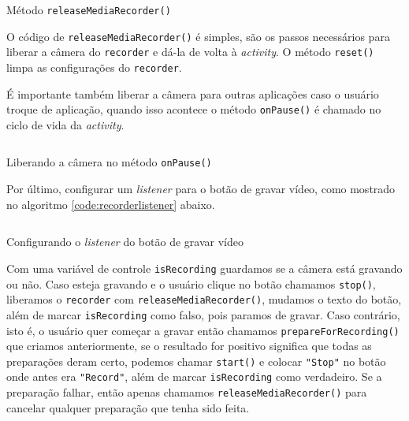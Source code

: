\documentclass[a4paper,12pt,brazil]{book}
\begin{document}
\begin{singlespace}
		\begin{listing}[H]
		\inputminted[linenos=true,fontsize=\small,frame=lines, framesep=2mm, tabsize=2,numbersep=5pt]{java}{src/api/camera/releaseRecorder.java}
		\caption{Método \texttt{releaseMediaRecorder()}}
		\label{code:releaserecorder}
		\end{listing} 			

		O código de \texttt{releaseMediaRecorder()} é simples, são os passos necessários para liberar a câmera do \texttt{recorder} e dá-la de volta à \emph{activity}.  O método \texttt{reset()} limpa as configurações do \texttt{recorder}.

		É importante também liberar a câmera para outras aplicações caso o usuário troque de aplicação, quando isso acontece o método \texttt{onPause()} é chamado no ciclo de vida da \emph{activity}.

		\begin{listing}[H]
		\inputminted[linenos=true,fontsize=\small,frame=lines, framesep=2mm, tabsize=2,numbersep=5pt]{java}{src/api/camera/releaseCam.java}
		\caption{Liberando a câmera no método \texttt{onPause()}}
		\label{code:releaserecorder}
		\end{listing} 			

		Por último, configurar um \emph{listener} para o botão de gravar vídeo, como mostrado no algoritmo \ref{code:recorderlistener} abaixo. 

		\begin{listing}[H]
		\inputminted[linenos=true,fontsize=\small,frame=lines, framesep=2mm, tabsize=2,numbersep=5pt]{java}{src/api/camera/recordlistener.java}
		\caption{Configurando o \emph{listener} do botão de gravar vídeo}
		\label{code:recorderlistener}
		\end{listing} 			

		Com uma variável de controle \texttt{isRecording} guardamos se a câmera está gravando ou não. Caso esteja gravando e o usuário clique no botão chamamos \texttt{stop()}, liberamos o \texttt{recorder} com \texttt{releaseMediaRecorder()}, mudamos o texto do botão, além de marcar \texttt{isRecording} como falso, pois paramos de gravar. Caso contrário, isto é, o usuário quer começar a gravar então chamamos \texttt{prepareForRecording()} que criamos anteriormente, se o resultado for positivo significa que todas as preparações deram certo, podemos chamar \texttt{start()} e colocar \texttt{"Stop"} no botão onde antes era \texttt{"Record"}, além de marcar \texttt{isRecording} como verdadeiro. Se a preparação falhar, então apenas chamamos \texttt{releaseMediaRecorder()} para cancelar qualquer preparação que tenha sido feita.


\end{singlespace}
\end{document}
